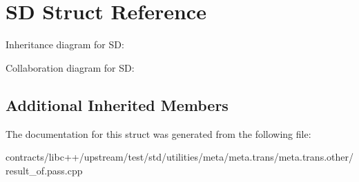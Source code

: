 \hypertarget{struct_s_d}{}\section{SD Struct Reference}
\label{struct_s_d}


Inheritance diagram for SD\+:


Collaboration diagram for SD\+:
\subsection*{Additional Inherited Members}


The documentation for this struct was generated from the following file\+:\begin{DoxyCompactItemize}
\item 
contracts/libc++/upstream/test/std/utilities/meta/meta.\+trans/meta.\+trans.\+other/result\+\_\+of.\+pass.\+cpp\end{DoxyCompactItemize}
